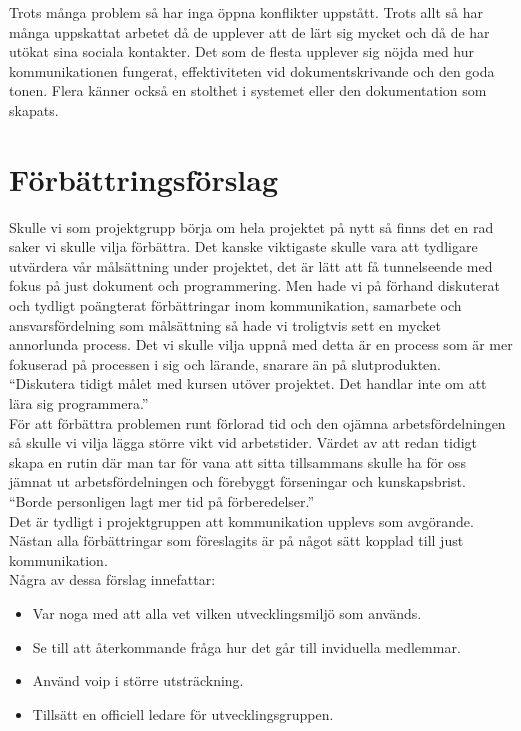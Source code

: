 \documentclass[paper=a4, fontsize=11pt,twoside]{article}
\begin{document}
Trots många problem så har inga öppna konflikter uppstått. Trots allt så har många 
uppskattat arbetet då de upplever att de lärt sig mycket och då de har utökat sina 
sociala kontakter. Det som de flesta upplever sig nöjda med hur kommunikationen fungerat, 
effektiviteten vid dokumentskrivande och den goda tonen. Flera känner också en stolthet 
i systemet eller den dokumentation som skapats.\\

\section{Förbättringsförslag}
Skulle vi som projektgrupp börja om hela projektet på nytt så finns det en rad saker 
vi skulle vilja förbättra. Det kanske viktigaste skulle vara att tydligare utvärdera 
vår målsättning under projektet, det är lätt att få tunnelseende med fokus på just 
dokument och programmering. Men hade vi på förhand diskuterat och tydligt poängterat 
förbättringar inom kommunikation, samarbete och ansvarsfördelning som målsättning 
så hade vi troligtvis sett en mycket annorlunda process. Det vi skulle vilja uppnå 
med detta är en process som är mer fokuserad på processen i sig och lärande, snarare 
än på slutprodukten.\\

``Diskutera tidigt målet med kursen utöver projektet. Det handlar inte om att
lära sig programmera.''\\

För att förbättra problemen runt förlorad tid och den ojämna arbetsfördelningen
så skulle vi vilja lägga större vikt vid arbetstider. Värdet av att redan 
tidigt skapa en rutin där man tar för vana att sitta tillsammans skulle 
ha för oss jämnat ut arbetsfördelningen och förebyggt förseningar och
kunskapsbrist.\\

``Borde personligen lagt mer tid på förberedelser.''\\

Det är tydligt i projektgruppen att kommunikation upplevs som avgörande. 
Nästan alla förbättringar som föreslagits är på något sätt kopplad till just 
kommunikation.\\

Några av dessa förslag innefattar:
\begin{itemize}
  \item Var noga med att alla vet vilken utvecklingsmiljö som används.
  \item Se till att återkommande fråga hur det går till inviduella medlemmar.
  \item Använd voip i större utsträckning.
  \item Tillsätt en officiell ledare för utvecklingsgruppen.
\end{itemize}
\end{document}
